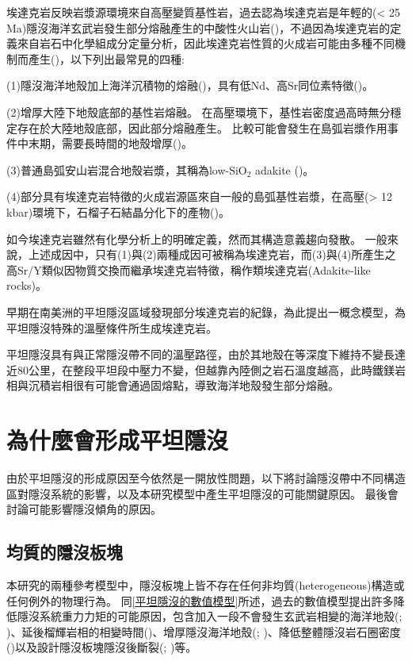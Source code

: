 埃達克岩反映岩漿源環境來自高壓變質基性岩，過去認為埃達克岩是年輕的(< 25 Ma)隱沒海洋玄武岩發生部分熔融產生的中酸性火山岩(\citealp{defant1990derivation})，不過因為埃達克岩的定義來自岩石中化學組成分定量分析，因此埃達克岩性質的火成岩可能由多種不同機制而產生(\citealp{martin2005overview})，以下列出最常見的四種:

(1)隱沒海洋地殼加上海洋沉積物的熔融(\citealp{defant1990derivation})，具有低Nd、高Sr同位素特徵(\citealp{gomez2003temporal})。

(2)增厚大陸下地殼底部的基性岩熔融。
在高壓環境下，基性岩密度過高時無分穩定存在於大陸地殼底部，因此部分熔融產生。
比較可能會發生在島弧岩漿作用事件中末期，需要長時間的地殼增厚(\citealp{kay2002magmatism})。

(3)普通島弧安山岩混合地殼岩漿，其稱為low-SiO$_2$ adakite (\citealp{martin2005overview})。

(4)部分具有埃達克岩特徵的火成岩源區來自一般的島弧基性岩漿，在高壓(> 12 kbar)環境下，石榴子石結晶分化下的產物(\citealp{moyen2009high})。

如今埃達克岩雖然有化學分析上的明確定義，然而其構造意義趨向發散。
一般來說，上述成因中，只有(1)與(2)兩種成因可被稱為埃達克岩，而(3)與(4)所產生之高Sr/Y類似因物質交換而繼承埃達克岩特徵，稱作類埃達克岩(Adakite-like rocks)。

早期在南美洲的平坦隱沒區域發現部分埃達克岩的紀錄，\citealp{Gutscher2000Bcan}為此提出一概念模型，為平坦隱沒特殊的溫壓條件所生成埃達克岩。

平坦隱沒具有與正常隱沒帶不同的溫壓路徑，由於其地殼在等深度下維持不變長達近80公里，在整段平坦段中壓力不變，但越靠內陸側之岩石溫度越高，此時鐵鎂岩相與沉積岩相很有可能會通過固熔點，導致海洋地殼發生部分熔融。

\section{為什麼會形成平坦隱沒}
由於平坦隱沒的形成原因至今依然是一開放性問題，以下將討論隱沒帶中不同構造區對隱沒系統的影響，以及本研究模型中產生平坦隱沒的可能關鍵原因。
最後會討論可能影響隱沒傾角的原因。
\subsection{均質的隱沒板塊}
本研究的兩種參考模型中，隱沒板塊上皆不存在任何非均質(heterogeneous)構造或任何例外的物理行為。
同\ref{平坦隱沒的數值模型}所述，過去的數值模型提出許多降低隱沒系統重力力矩的可能原因，包含加入一段不會發生玄武岩相變的海洋地殼(\citealp{Liu2016}; \citealp{Gerya2009})、延後榴輝岩相的相變時間(\citealp{van2002role})、增厚隱沒海洋地殼(\citealp{Liu2016}; \citealp{axen2018basal})、降低整體隱沒岩石圈密度(\citealp{Gerya2009})以及設計隱沒板塊隱沒後斷裂(\citealp{Liu2016}; \citealp{axen2018basal})等。

